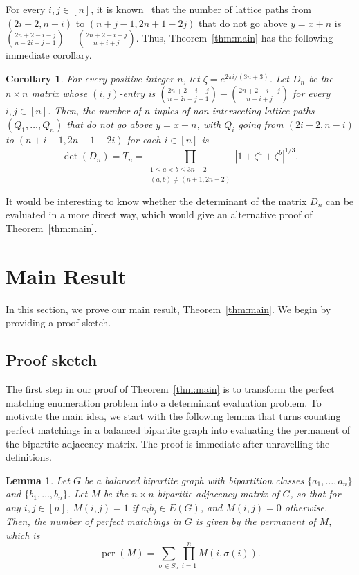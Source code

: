 \documentclass{article}
\DeclareMathOperator\per{per}
\newtheorem{lemma}[theorem]{Lemma}
\newtheorem{corollary}[theorem]{Corollary}
\begin{document}
For every $i,j\in[n]$, it is known~{\cite[Theorem 10.3.1]{Kra}} that the number of lattice paths from $(2i-2,n-i)$ to $(n+j-1,2n+1-2j)$ that do not go above $y=x+n$ is $\binom{2n+2-i-j}{n-2i+j+1}-\binom{2n+2-i-j}{n+i+j}$. Thus, Theorem~\ref{thm:main} has the following immediate corollary. 
\begin{corollary}\label{cor:LGV}
For every positive integer $n$, let $\zeta=e^{2\pi i/(3n+3)}$. Let $D_n$ be the $n\times n$ matrix whose $(i,j)$-entry is $\binom{2n+2-i-j}{n-2i+j+1}-\binom{2n+2-i-j}{n+i+j}$ for every $i,j\in[n]$. Then, the number of $n$-tuples of non-intersecting lattice paths $(Q_1,\ldots,Q_n)$ that do not go above $y=x+n$, with $Q_i$ going from $(2i-2,n-i)$ to $(n+i-1,2n+1-2i)$ for each $i\in[n]$ is 
\[\det(D_n)=T_n=\prod_{\substack{1\leq a<b\leq 3n+2\\(a,b)\not=(n+1,2n+2)}}\left|1+\zeta^a+\zeta^b\right|^{1/3}.\]
\end{corollary}

It would be interesting to know whether the determinant of the matrix $D_n$ can be evaluated in a more direct way, which would give an alternative proof of Theorem~\ref{thm:main}. 

\section{Main Result}
In this section, we prove our main result, Theorem~\ref{thm:main}. We begin by providing a proof sketch.
\subsection{Proof sketch}\label{sec:sketch}
The first step in our proof of Theorem~\ref{thm:main} is to transform the perfect matching enumeration problem into a determinant evaluation problem. To motivate the main idea, we start with the following lemma that turns counting perfect matchings in a balanced bipartite graph into evaluating the permanent of the bipartite adjacency matrix. The proof is immediate after unravelling the definitions.
\begin{lemma}\label{lemma:perm}
Let $G$ be a balanced bipartite graph with bipartition classes $\{a_1,\ldots,a_n\}$ and $\{b_1,\ldots,b_n\}$. Let $M$ be the $n\times n$ bipartite adjacency matrix of $G$, so that for any $i,j\in[n]$, $M(i,j)=1$ if $a_ib_j\in E(G)$, and $M(i,j)=0$ otherwise. Then, the number of perfect matchings in $G$ is given by the permanent of $M$, which is
\[\per(M)=\sum_{\sigma\in S_n}\prod_{i=1}^nM(i,\sigma(i)).\]
\end{lemma}
\end{document}
